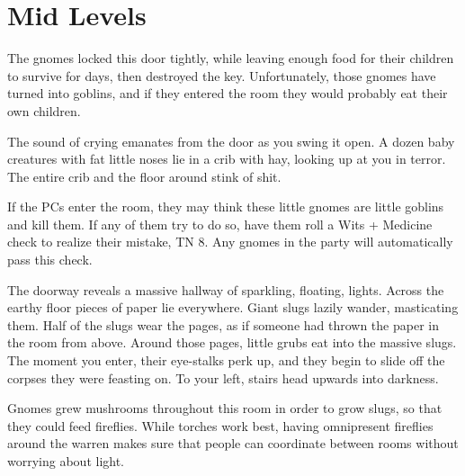 \section{Mid Levels}

\begin{multicols}{2}


\begin{exampletext}

	The gnomes locked this door tightly, while leaving enough food for their children to survive for days, then destroyed the key.
	Unfortunately, those gnomes have turned into goblins, and if they entered the room they would probably eat their own children.

\end{exampletext}

\begin{boxtext}

	The sound of crying emanates from the door as you swing it open.
	A dozen baby creatures with fat little noses lie in a crib with hay, looking up at you in terror.
	The entire crib and the floor around stink of shit.

\end{boxtext}

If the PCs enter the room, they may think these little gnomes are little goblins and kill them.
If any of them try to do so, have them roll a Wits + Medicine check to realize their mistake, TN 8.
Any gnomes in the party will automatically pass this check.


\begin{boxtext}

	The doorway reveals a massive hallway of sparkling, floating, lights.
	Across the earthy floor pieces of paper lie everywhere.
	Giant slugs lazily wander, masticating them.
	Half of the slugs wear the pages, as if someone had thrown the paper in the room from above.
	Around those pages, little grubs eat into the massive slugs.
	The moment you enter, their eye-stalks perk up, and they begin to slide off the corpses they were feasting on.
	To your left, stairs head upwards into darkness.

\end{boxtext}

Gnomes grew mushrooms throughout this room in order to grow slugs, so that they could feed fireflies.
While torches work best, having omnipresent fireflies around the warren makes sure that people can coordinate between rooms without worrying about light.


\end{multicols}
